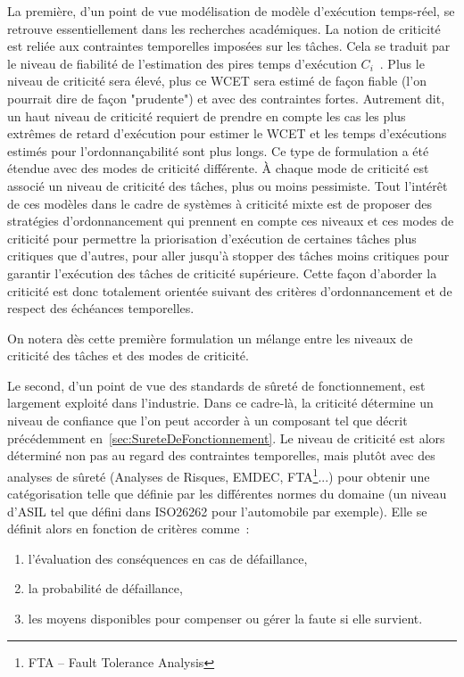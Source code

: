 \documentclass[french, a4paper, 11pt, twoside, pdftex]{StyleThese}
\begin{document}
    La première, d'un point de vue modélisation de modèle d'exécution temps-réel, se retrouve essentiellement dans les recherches académiques. La notion de criticité est reliée aux contraintes temporelles imposées sur les tâches. Cela se traduit par le niveau de fiabilité de l'estimation des pires temps d'exécution $C_i$~\cite{vestal_preemptive_2007}. 
    Plus le niveau de criticité sera élevé, plus ce WCET sera estimé de façon fiable (l'on pourrait dire de façon "prudente") et avec des contraintes fortes. Autrement dit, un haut niveau de criticité requiert de prendre en compte les cas les plus extrêmes de retard d'exécution pour estimer le WCET et les temps d'exécutions estimés pour l'ordonnançabilité sont plus longs. Ce type de formulation a été étendue avec des modes de criticité différente. À chaque mode de criticité est associé un niveau de criticité des tâches, plus ou moins pessimiste.
    Tout l'intérêt de ces modèles  dans le cadre de systèmes à criticité mixte est de proposer des stratégies d'ordonnancement qui prennent en compte ces niveaux et ces modes de criticité pour permettre la priorisation d'exécution de certaines tâches plus critiques que d'autres, pour aller jusqu'à stopper des tâches moins critiques pour garantir l'exécution des tâches de criticité supérieure. Cette façon d'aborder la criticité est donc totalement orientée suivant des critères d'ordonnancement et de respect des échéances temporelles.
    
    On notera dès cette première formulation un mélange entre les niveaux de criticité des tâches et des modes de criticité. 

    Le second, d'un point de vue des standards de sûreté de fonctionnement, est largement exploité dans l'industrie. Dans ce cadre-là, la criticité détermine un niveau de confiance que l'on peut accorder à un composant tel que décrit précédemment en~\autoref{sec:SureteDeFonctionnement}. Le niveau de criticité est alors déterminé non pas au regard des contraintes temporelles, mais plutôt avec des analyses de sûreté (Analyses de Risques, EMDEC, FTA\footnote{FTA -- Fault Tolerance Analysis}...) pour obtenir une catégorisation telle que définie par les différentes normes du domaine (un niveau d'ASIL tel que défini dans ISO26262 pour l'automobile par exemple). Elle se définit alors en fonction de critères comme~: 
\begin{enumerate}[label=\textbf{\alph*)}]
	\item     l'évaluation des conséquences en cas de défaillance, 
	\item     la probabilité de défaillance, 
	\item     les moyens disponibles pour compenser ou gérer la faute si elle survient.
\end{enumerate}
\end{document}
